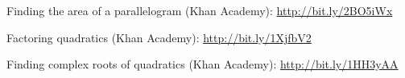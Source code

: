 \begin{readinessAssuranceResources}
\item Finding the area of a parallelogram (Khan Academy):
      \url{http://bit.ly/2BO5iWx}
\item Factoring quadratics (Khan Academy):
      \url{http://bit.ly/1XjfbV2}
\item Finding complex roots of quadratics (Khan Academy):
      \url{http://bit.ly/1HH3yAA}
\end{readinessAssuranceResources}

